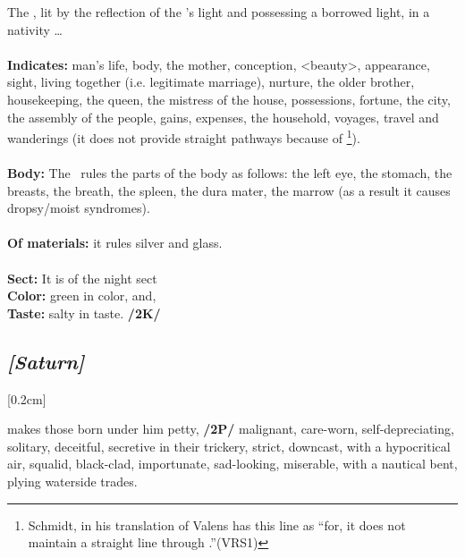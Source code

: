 The \Moon{}, lit by the reflection of the \Sun’s light and possessing a borrowed light, in a nativity \ldots \\
\\
\textbf{Indicates:} man’s life, body, the mother, conception, <beauty>, appearance, sight, living together (i.e. legitimate marriage), nurture, the older brother, housekeeping, the queen, the mistress of the house, possessions, fortune, the city, the assembly of the people, gains, expenses, the household, voyages, travel and wanderings (it does not provide straight pathways because of \Cancer
\footnote{Schmidt, in his translation of Valens has this line as ``for, it does not maintain a straight line through \Cancer.''(VRS1)}). \\
\\
\textbf{Body:} The \Moon\, rules the parts of the body as follows: the left eye, the stomach, the breasts, the breath, the spleen, the dura mater, the marrow (as a result it causes dropsy/moist syndromes). \\
\\
\textbf{Of materials:} it rules silver and glass. \\
\\
\textbf{Sect:} It is of the night sect \\
\textbf{Color:} green in color, and, \\
\textbf{Taste:} salty in taste. \textbf{/2K/}
\secbr
\subsection{\textit{[Saturn]}}
[0.2cm]

\Saturn{} makes those born under him petty, \textbf{/2P/} malignant, care-worn, self-depreciating, solitary, deceitful, secretive in their trickery, strict, downcast, with a hypocritical air, squalid, black-clad, importunate, sad-looking, miserable, with a nautical bent, plying waterside trades. 

